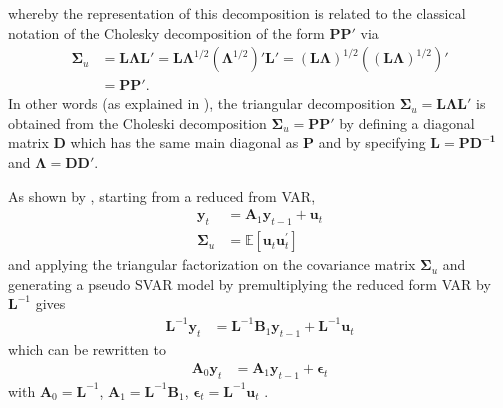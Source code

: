 \documentclass[a4paper,11pt,listof=nochaptergap,oneside,pointednumbers,bibtotoc,bigheadings,liststotoc,hidelinks]{scrbook}
\theoremstyle{mysatz}
\theoremstyle{mydefinition}
\theoremstyle{mytheorem}
\theoremstyle{mybemerkung}
\newcommand{\vect}[1]{\boldsymbol{\mathbf{#1}}}
\begin{document}
whereby the representation of this decomposition is related to the classical notation of the Cholesky decomposition of the form $\vect{PP'}$ via
\begin{equation} \label{eq:svar17}
\begin{split}
	\vect{\Sigma}_u & = \vect{L}\vect{\Lambda}\vect{L}' = \vect{L}\vect{\Lambda}^{1/2}(\vect{\Lambda}^{1/2})'\vect{L}' = (\vect{L}\vect{\Lambda})^{1/2}\left ( (\vect{L}\vect{\Lambda})^{1/2}\right )' \\
				& = \vect{P}\vect{P'}.
\end{split}								
\end{equation}
In other words (as explained in \citealp{rossi:11}), the triangular decomposition $\vect{\Sigma}_u = \vect{L}\vect{\Lambda}\vect{L'}$ is obtained from the Choleski decomposition $\vect{\Sigma}_u = \vect{P}\vect{P'}$ by defining a diagonal matrix $\vect{D}$ which has the same main diagonal as $\vect{P}$ and by specifying $\vect{L} = \vect{P}\vect{D^{-1}}$ and $\vect{\Lambda} = \vect{D}\vect{D'}$.

As shown by \citet{zivot:00}, starting from a reduced from VAR,
\begin{equation} \label{eq:svar18}
\begin{split}
	\vect{y}_t & = \vect{A}_1\vect{y}_{t-1} + \vect{u}_t \\
	\vect{\Sigma}_u & = \mathbb{E}[\vect{u}_t\vect{u}_t^']
\end{split}								
\end{equation}
and applying the triangular factorization on the covariance matrix $\vect{\Sigma}_u$ and generating a pseudo SVAR model by premultiplying the reduced form VAR by $\vect{L}^{-1}$ gives
\begin{equation} \label{eq:svar19}
\begin{split}
	\vect{L}^{-1}\vect{y}_t & = \vect{L}^{-1}\vect{B}_1\vect{y}_{t-1} + \vect{L}^{-1}\vect{u}_t
\end{split}								
\end{equation}
which can be rewritten to
\begin{equation} \label{eq:svar21}
\begin{split}
	\vect{A}_0\vect{y}_t & = \vect{A}_1\vect{y}_{t-1} + \vect{\epsilon}_t
\end{split}								
\end{equation}
with $\vect{A}_0 = \vect{L}^{-1}$, $\vect{A}_1 = \vect{L}^{-1}\vect{B}_1$, $\vect{\epsilon}_t = \vect{L}^{-1}\vect{u}_t$ \citep{zivot:00}.
\end{document}
